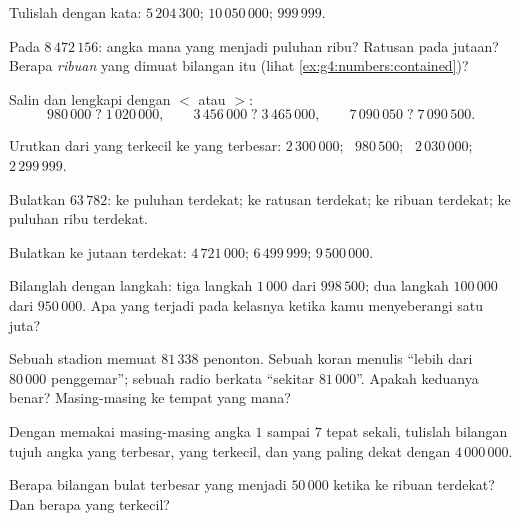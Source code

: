 \begin{exercise}[$\star$]\label{exo:g4:numbers:2}
Tulislah dengan kata: $5\,204\,300$; \quad $10\,050\,000$; \quad
$999\,999$.
\end{exercise}

\begin{exercise}[$\star$]\label{exo:g4:numbers:3}
Pada $8\,472\,156$: angka mana yang menjadi puluhan ribu? Ratusan
pada  jutaan? Berapa \emph{ribuan} yang dimuat bilangan itu
(lihat \cref{ex:g4:numbers:contained})?
\end{exercise}

\begin{exercise}[$\star$]\label{exo:g4:numbers:4}
Salin dan lengkapi dengan $<$ atau $>$:
\[
980\,000 \;?\; 1\,020\,000, \qquad
3\,456\,000 \;?\; 3\,465\,000, \qquad
7\,090\,050 \;?\; 7\,090\,500 .
\]
\end{exercise}

\begin{exercise}[$\star$]\label{exo:g4:numbers:5}
Urutkan dari yang terkecil ke yang terbesar: $2\,300\,000$; \ $980\,500$; \
$2\,030\,000$; \ $2\,299\,999$.
\end{exercise}

\begin{exercise}[$\star$]\label{exo:g4:numbers:6}
Bulatkan $63\,782$: ke puluhan terdekat; ke ratusan terdekat; ke
ribuan terdekat; ke puluhan ribu terdekat.
\end{exercise}

\begin{exercise}[$\star$]\label{exo:g4:numbers:7}
Bulatkan ke jutaan terdekat: $4\,721\,000$; \quad $6\,499\,999$;
\quad $9\,500\,000$.
\end{exercise}

\begin{exercise}[$\star$]\label{exo:g4:numbers:8}
Bilanglah dengan langkah: tiga langkah $1\,000$ dari $998\,500$; dua
langkah $100\,000$ dari $950\,000$. Apa yang terjadi pada kelasnya
ketika kamu menyeberangi satu juta?
\end{exercise}

\begin{exercise}[$\star$]\label{exo:g4:numbers:9}
Sebuah stadion memuat $81\,338$ penonton. Sebuah koran menulis
``lebih dari $80\,000$ penggemar''; sebuah radio berkata ``sekitar
$81\,000$''. Apakah keduanya benar? Masing-masing  ke tempat yang mana?
\end{exercise}

\begin{exercise}[$\star\star$]\label{exo:g4:numbers:10}
Dengan memakai masing-masing angka $1$ sampai $7$ tepat sekali,
tulislah bilangan tujuh angka yang terbesar, yang terkecil, dan yang
paling dekat dengan $4\,000\,000$.
\end{exercise}

\begin{exercise}[$\star\star$]\label{exo:g4:numbers:11}
Berapa bilangan bulat terbesar yang menjadi $50\,000$ ketika
 ke ribuan terdekat? Dan berapa yang terkecil?

\end{exercise}
